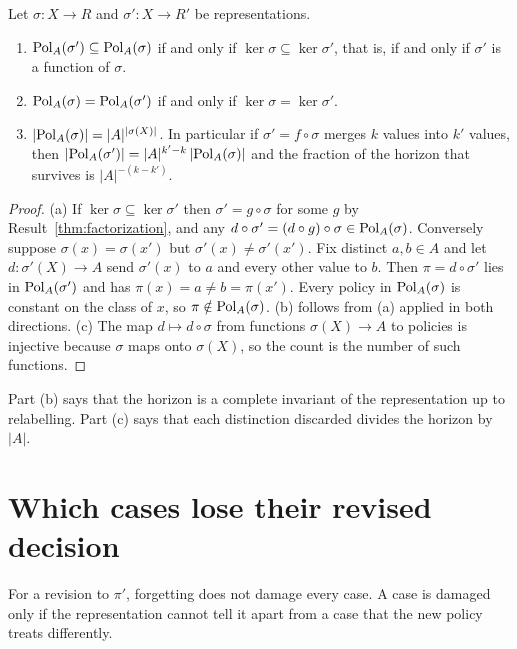 \begin{newresult}\label{thm:horizon}
Let $\sigma:X\to R$ and $\sigma':X\to R'$ be representations.
\begin{enumerate}[nosep,label=(\alph*)]
  \item $\mathrm{Pol}_A(\sigma')\subseteq\mathrm{Pol}_A(\sigma)$ if and only if $\ker\sigma\subseteq\ker\sigma'$, that is, if and only if $\sigma'$ is a function of $\sigma$.
  \item $\mathrm{Pol}_A(\sigma)=\mathrm{Pol}_A(\sigma')$ if and only if $\ker\sigma=\ker\sigma'$.
  \item $|\mathrm{Pol}_A(\sigma)|=|A|^{|\sigma(X)|}$. In particular if $\sigma'=f\circ\sigma$ merges $k$ values into $k'$ values, then $|\mathrm{Pol}_A(\sigma')|=|A|^{k'-k}\,|\mathrm{Pol}_A(\sigma)|$ and the fraction of the horizon that survives is $|A|^{-(k-k')}$.
\end{enumerate}
\end{newresult}
\begin{proof}
(a) If $\ker\sigma\subseteq\ker\sigma'$ then $\sigma'=g\circ\sigma$ for some $g$ by Result~\ref{thm:factorization}, and any $d\circ\sigma'=(d\circ g)\circ\sigma\in\mathrm{Pol}_A(\sigma)$. Conversely suppose $\sigma(x)=\sigma(x')$ but $\sigma'(x)\ne\sigma'(x')$. Fix distinct $a,b\in A$ and let $d:\sigma'(X)\to A$ send $\sigma'(x)$ to $a$ and every other value to $b$. Then $\pi=d\circ\sigma'$ lies in $\mathrm{Pol}_A(\sigma')$ and has $\pi(x)=a\ne b=\pi(x')$. Every policy in $\mathrm{Pol}_A(\sigma)$ is constant on the class of $x$, so $\pi\notin\mathrm{Pol}_A(\sigma)$. (b) follows from (a) applied in both directions. (c) The map $d\mapsto d\circ\sigma$ from functions $\sigma(X)\to A$ to policies is injective because $\sigma$ maps onto $\sigma(X)$, so the count is the number of such functions.
\end{proof}

Part (b) says that the horizon is a complete invariant of the representation up to relabelling. Part (c) says that each distinction discarded divides the horizon by $|A|$.

\section{Which cases lose their revised decision}

For a revision to $\pi'$, forgetting does not damage every case. A case is damaged only if the representation cannot tell it apart from a case that the new policy treats differently.

